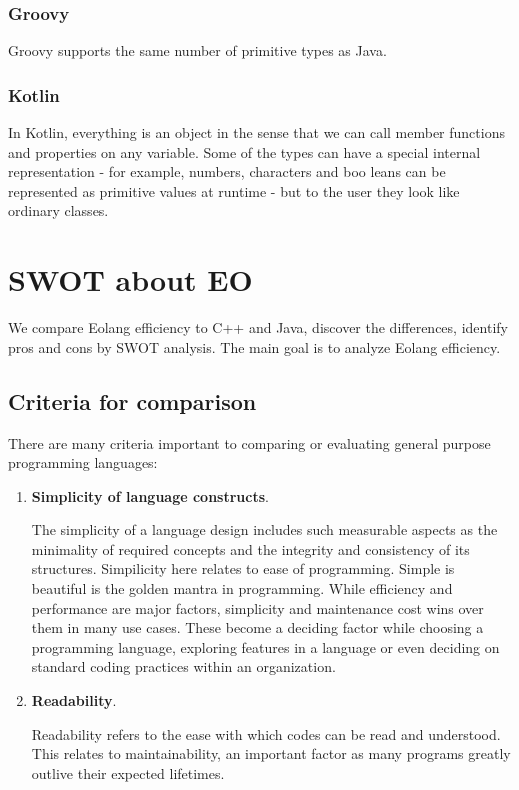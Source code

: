 \documentclass[12pt]{book}
\begin{document}
{{\subsection{Groovy}
Groovy supports the same number of primitive types as Java.

\subsection{Kotlin}
In Kotlin, everything is an object in the sense that we can call member functions and properties on any variable.  Some of the types can have a special internal representation - for example,  numbers, characters and boo leans can be represented  as primitive values at runtime - but to the user they look like ordinary classes.

\chapter{SWOT about EO}
We compare Eolang efficiency to C++ and Java, discover the differences, identify pros and cons by SWOT analysis. The main goal is to analyze Eolang efficiency.

\section{Criteria for comparison}
There are many criteria important to comparing or evaluating general purpose programming languages:

\begin{enumerate}
    \item \textbf{Simplicity of language constructs}.
    
The simplicity of a language design includes such measurable aspects as the minimality of required concepts and the integrity and consistency of its structures. Simpilicity here relates to ease of programming. Simple is beautiful is the golden mantra in programming. While efficiency and performance are major factors, simplicity and maintenance cost wins over them in many use cases. These become a deciding factor while choosing a programming language, exploring features in a language or even deciding on standard coding practices within an organization.

    \item \textbf{Readability}.
    
Readability refers to the ease with which codes can be read and understood. This relates to maintainability, an important factor as many programs greatly outlive their expected lifetimes.


\end{enumerate}}}
\end{document}
